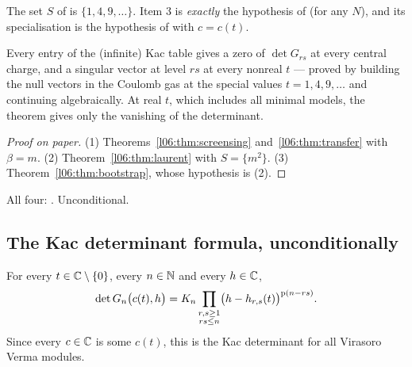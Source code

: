\begin{dictionary}
The set $S$ of \allowbreak{}\allowbreak{}\allowbreak{} is $\{1,4,9,\dots\}$. Item 3 is \emph{exactly} the
hypothesis  of \allowbreak{}\allowbreak{}\allowbreak{}\allowbreak{}\allowbreak{} (for any $N$), and its specialisation is
the hypothesis of \allowbreak{}\allowbreak{}\allowbreak{}\allowbreak{} with $c = c(t)$.
\end{dictionary}

\begin{physics}
Every entry of the (infinite) Kac table gives a zero of $\det G_{rs}$ at every central charge, and a
singular vector at level $rs$ at every nonreal $t$ --- proved by building the null vectors in the Coulomb gas at
the special values $t = 1,4,9,\dots$ and continuing algebraically. At real $t$, which includes all minimal
models, the theorem gives only the vanishing of the determinant.
\end{physics}

\begin{proof}[Proof on paper]
(1) Theorems~\ref{l06:thm:screensing} and~\ref{l06:thm:transfer} with $\beta = m$. (2) Theorem~\ref{l06:thm:laurent}
with $S = \{m^2\}$. (3) Theorem~\ref{l06:thm:bootstrap}, whose hypothesis is (2).
\end{proof}

\begin{status}
All four: \lean{[propext, Classical.}\allowbreak{}\allowbreak\lean{sound]}. Unconditional.
\end{status}

\subsection{The Kac determinant formula, unconditionally}\label{l06:sec:kacunconditional}

\begin{theorem}\label{l06:thm:kacfull}
For every $t\in{\mathbb{C}}\setminus\{0\}$, every $n\in{\mathbb{N}}$ and every $h\in{\mathbb{C}}$,
\begin{equation*}
 \det G_n\bigl(c(t),h\bigr) = K_n\prod_{\substack{r,s\ge1\\ rs\le n}}\bigl(h-h_{r,s}(t)\bigr)^{\mathrm{p}(n-rs)} .
\end{equation*}
Since every $c\in{\mathbb{C}}$ is some $c(t)$, this is the Kac determinant for all Virasoro Verma modules.
\end{theorem}

